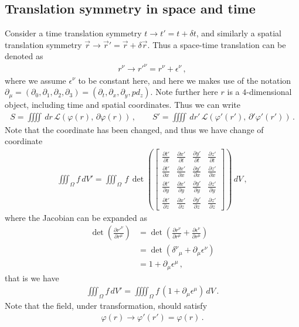 \documentclass[11pt, onesided]{book}
\theoremstyle{break}
\theoremstyle{break}
\newcommand{\pd}{\partial}
\newcommand{\bmat}[1]{\begin{bmatrix} #1 \end{bmatrix}}
\begin{document}
\subsection{Translation symmetry in space and time}
Consider a time translation symmetry $t \to t' = t + \delta t$, and similarly a spatial translation symmetry $\vec{r} \to \vec{r}' = \vec{r} + \delta \vec{r}$. Thus a space-time translation can be denoted as 
\begin{align*}
r^\nu \to r'^{\nu} = r^\nu + \epsilon^\nu\,,
\end{align*}
where we assume $\epsilon^\nu$ to be constant here, and here we makes use of the notation $\pd_\mu = (\pd_0, \pd_1, \pd_2, \pd_3)=(\pd_t, \pd_x, \pd_y, pd_z)$. Note further here $r$ is a $4$-dimensional object, including time and spatial coordinates. Thus we can write
\begin{align*}
S = \iiiint \, dr \, \mathcal{L}\left(\varphi(r),\, \pd\varphi(r)\right)\,,\qquad 
S' = \iiiint \, dr' \, \mathcal{L}\left(\varphi'(r'),\, \pd'\varphi'(r')\right)\,.
\end{align*}
Note that the coordinate has been changed, and thus we have change of coordinate
\begin{align*}
\iiint_{\Omega} f\, dV' = \iiint_{\Omega}\, f\, \det\left(
\bmat{\frac{\pd t'}{\pd t}&  \frac{\pd x'}{\pd t}&  \frac{\pd y'}{\pd t}&  \frac{\pd z'}{\pd t}\\
\frac{\pd t'}{\pd x}&  \frac{\pd x'}{\pd x}&  \frac{\pd y'}{\pd x}&  \frac{\pd z'}{\pd x}\\
\frac{\pd t'}{\pd y}&  \frac{\pd x'}{\pd y}&  \frac{\pd y'}{\pd y}&  \frac{\pd z'}{\pd y}\\
\frac{\pd t'}{\pd z}&  \frac{\pd x'}{\pd z}&  \frac{\pd y'}{\pd z}&  \frac{\pd z'}{\pd z} } 
\right)\, dV\,,
\end{align*}
where the Jacobian can be expanded as
\begin{align*}
\det\left( \frac{\pd r'^\nu}{\pd r^\mu}\right) 
&= \det\left( \frac{\pd r^\nu}{\pd r^\mu} +\frac{\pd \epsilon^\nu}{\pd r^\mu}\right)\\
&= \det\left( \delta^\nu{}_\mu + \pd_\mu \epsilon^\nu\right) \\
&= 1 + \pd_\mu\epsilon^\mu\,,
\end{align*}
that is we have
\begin{align*}
\iiint_{\Omega} f\, dV' = \iiiint_{\Omega} f\, (1 + \pd_\mu \epsilon^\mu)\, dV\,.
\end{align*}
Note that the field, under transformation, should satisfy 
\begin{align*}
\varphi(r) \to \varphi'(r') = \varphi(r)\,.
\end{align*}
\end{document}
